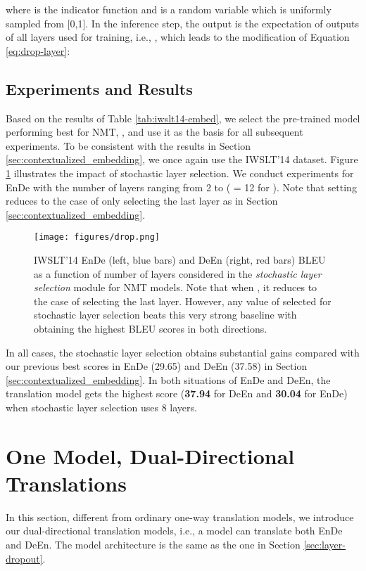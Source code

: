 \documentclass[11pt]{article}
\begin{document}
where  is the indicator function and  is a random variable which is uniformly sampled from [0,1]. In the inference step, the output is the expectation of outputs of all layers used for training, i.e., , which leads to the modification of Equation \ref{eq:drop-layer}:



\subsection{Experiments and Results}
Based on the results of Table \ref{tab:iwslt14-embed}, we select the pre-trained model performing best for NMT, , and use it as the basis for
all subsequent experiments. To be consistent with the results in Section \ref{sec:contextualized_embedding}, we once again use the IWSLT'14 dataset. Figure \ref{fig:drop} illustrates the impact of stochastic layer selection. We conduct experiments for EnDe with the number of layers  ranging from 2 to  ( = 12 for ). Note that setting  reduces to the case of only selecting  the last layer as in Section \ref{sec:contextualized_embedding}.
\begin{figure}[t]
    \centering
    \texttt{[image: figures/drop.png]}
    \caption{IWSLT'14 EnDe (left, blue bars) and DeEn (right, red bars) BLEU as a function of number of layers  considered in the \textit{stochastic layer selection} module for NMT models. Note that when , it reduces to the case of selecting the last layer. However, any value of  selected for stochastic layer selection beats this very strong baseline with  obtaining the highest BLEU scores in both directions.}
    \label{fig:drop}
\end{figure}

In all cases, the stochastic layer selection obtains substantial gains compared with our previous best scores in EnDe (29.65) and DeEn (37.58) in Section \ref{sec:contextualized_embedding}. In both situations of EnDe and DeEn, the translation model gets the highest score (\textbf{37.94} for DeEn and \textbf{30.04} for EnDe) when stochastic layer selection uses 8 layers. 

\section{One Model, Dual-Directional Translations}
\label{sec:bidirection-model}
In this section, different from ordinary one-way translation models, we introduce our dual-directional translation models, i.e., a model can translate both EnDe and DeEn. The model architecture is the same as the one in Section \ref{sec:layer-dropout}.
\end{document}
